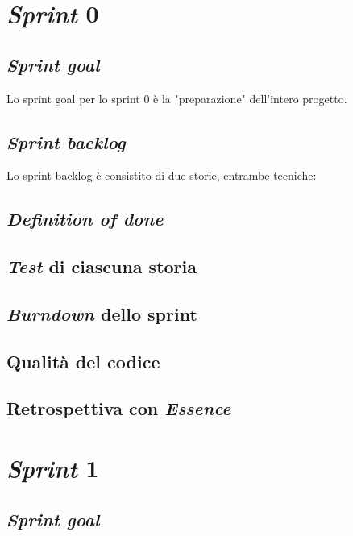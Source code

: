 \documentclass{article}
\begin{document}
\section{\emph{Sprint} 0}

\subsection{\emph{Sprint goal}}

Lo sprint goal per lo sprint 0 è la "preparazione" dell'intero progetto.

\subsection{\emph{Sprint backlog}}

Lo sprint backlog è consistito di due storie, entrambe tecniche:



\subsection{\emph{Definition of done}}

\subsection{\emph{Test} di ciascuna storia}

\subsection{\emph{Burndown} dello sprint}

\subsection{Qualità del codice}

\subsection{Retrospettiva con \emph{Essence}}

\section{\emph{Sprint} 1}

\subsection{\emph{Sprint goal}}
\end{document}
